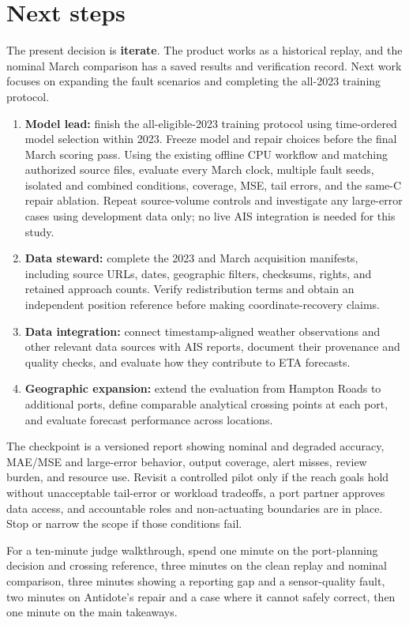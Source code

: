 \documentclass[11pt]{article}
\begin{document}
\section{Next steps}
The present decision is \textbf{iterate}. The product works as a historical replay, and the nominal March comparison has a saved results and verification record. Next work focuses on expanding the fault scenarios and completing the all-2023 training protocol.
\begin{enumerate}
\item \textbf{Model lead:} finish the all-eligible-2023 training protocol using time-ordered model selection within 2023. Freeze model and repair choices before the final March scoring pass. Using the existing offline CPU workflow and matching authorized source files, evaluate every March clock, multiple fault seeds, isolated and combined conditions, coverage, MSE, tail errors, and the same-C repair ablation. Repeat source-volume controls and investigate any large-error cases using development data only; no live AIS integration is needed for this study.
\item \textbf{Data steward:} complete the 2023 and March acquisition manifests, including source URLs, dates, geographic filters, checksums, rights, and retained approach counts. Verify redistribution terms and obtain an independent position reference before making coordinate-recovery claims.
\item \textbf{Data integration:} connect timestamp-aligned weather observations and other relevant data sources with AIS reports, document their provenance and quality checks, and evaluate how they contribute to ETA forecasts.
\item \textbf{Geographic expansion:} extend the evaluation from Hampton Roads to additional ports, define comparable analytical crossing points at each port, and evaluate forecast performance across locations.
\end{enumerate}
The checkpoint is a versioned report showing nominal and degraded accuracy, MAE/MSE and large-error behavior, output coverage, alert misses, review burden, and resource use. Revisit a controlled pilot only if the reach goals hold without unacceptable tail-error or workload tradeoffs, a port partner approves data access, and accountable roles and non-actuating boundaries are in place. Stop or narrow the scope if those conditions fail.

For a ten-minute judge walkthrough, spend one minute on the port-planning decision and crossing reference, three minutes on the clean replay and nominal comparison, three minutes showing a reporting gap and a sensor-quality fault, two minutes on Antidote's repair and a case where it cannot safely correct, then one minute on the main takeaways.
\end{document}

